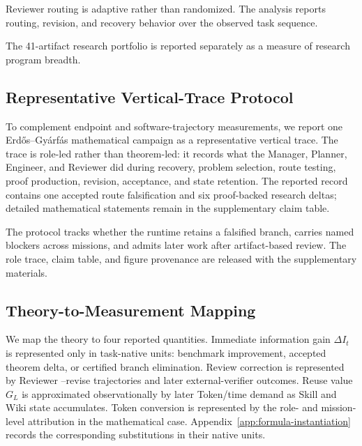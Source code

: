 Reviewer routing is adaptive rather than randomized. The analysis reports routing,
revision, and recovery behavior over the observed task sequence.

The 41-artifact research portfolio is reported separately as a measure of research
program breadth.

\subsection{Representative Vertical-Trace Protocol}

To complement endpoint and software-trajectory measurements, we report one
Erd\H{o}s--Gy\'arf\'as mathematical campaign as a representative vertical trace.
The trace is role-led rather than theorem-led: it records what the Manager,
Planner, Engineer, and Reviewer did during recovery, problem selection, route
testing, proof production, revision, acceptance, and state retention. The reported
record contains one accepted route falsification and six proof-backed research
deltas; detailed mathematical statements remain in the supplementary claim table.

The protocol tracks whether the runtime retains a falsified branch, carries named
blockers across missions, and admits later work after artifact-based review. The
role trace, claim table, and figure provenance are released with the
supplementary materials.

\subsection{Theory-to-Measurement Mapping}

We map the theory to four reported quantities. Immediate information gain
$\Delta I_t$ is represented only in task-native units: benchmark improvement,
accepted theorem delta, or certified branch elimination. Review correction is
represented by Reviewer --revise trajectories and later
external-verifier outcomes. Reuse value $G_L$ is approximated observationally by
later Token/time demand as Skill and Wiki state accumulates. Token conversion is
represented by the role- and mission-level attribution in the mathematical case.
Appendix~\ref{app:formula-instantiation} records the corresponding substitutions in
their native units.
